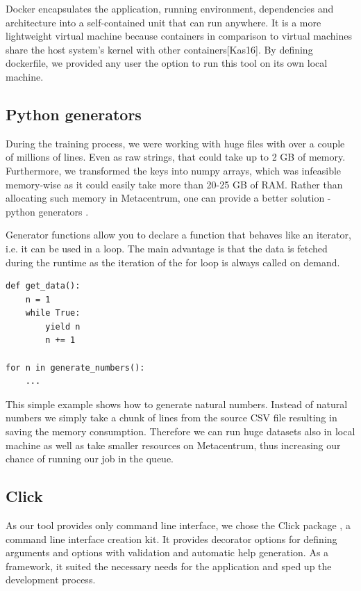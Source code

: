 Docker encapsulates the application, running environment, dependencies and architecture into a self-contained unit that can run anywhere. It is a more lightweight virtual machine because containers in comparison to virtual machines share the host system’s kernel with other containers[Kas16]. By defining dockerfile, we provided any user the option to run this tool on its own local machine.

\subsection{Python generators}

\label{python-generators}

During the training process, we were working with huge files with over a couple of millions of lines. Even as raw strings, that could take up to 2 GB of memory. Furthermore, we transformed the keys into numpy arrays, which was infeasible memory-wise as it could easily take more than 20-25 GB of RAM. Rather than allocating such memory in Metacentrum, one can provide a better solution - python generators \cite{python-gen}. 

Generator functions allow you to declare a function that behaves like an iterator, i.e. it can be used in a loop. The main advantage is that the data is fetched during the runtime as the iteration of the for loop is always called on demand.

\begin{verbatim}
def get_data():
    n = 1
    while True:
        yield n
        n += 1
		
for n in generate_numbers():
    ...
\end{verbatim}

This simple example shows how to generate natural numbers. Instead of natural numbers we simply take a chunk of lines from the source CSV file resulting in saving the memory consumption. Therefore we can run huge datasets also in local machine as well as take smaller resources on Metacentrum, thus increasing our chance of running our job in the queue.

\subsection{Click}

As our tool provides only command line interface, we chose the Click package \cite{click}, a command line interface creation kit. It provides decorator options for defining arguments and options with validation and automatic help generation. As a framework, it suited the necessary needs for the application and sped up the development process.

